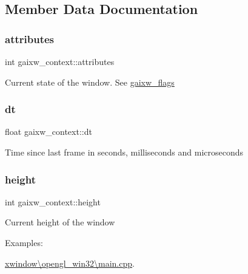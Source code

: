 \subsection{Member Data Documentation}
\mbox{\label{structgaixw__context_ab0f6565b924d7496d7445915f01294e2}} 
\subsubsection{\texorpdfstring{attributes}{attributes}}
{\footnotesize\ttfamily int gaixw\+\_\+context\+::attributes}

Current state of the window. See \hyperlink{gai__xwindow_8h_af7f3997c9f7d608f6f480d0a1ec341ec}{gaixw\+\_\+flags} \mbox{\label{structgaixw__context_a7b04c4d4c59ab6354686a79221673ad8}} 
\subsubsection{\texorpdfstring{dt}{dt}}
{\footnotesize\ttfamily float gaixw\+\_\+context\+::dt}

Time since last frame in seconds, milliseconds and microseconds \mbox{\label{structgaixw__context_a42531a46c276892a37d32595f819dd8e}} 
\subsubsection{\texorpdfstring{height}{height}}
{\footnotesize\ttfamily int gaixw\+\_\+context\+::height}

Current height of the window \begin{Desc}
\item[Examples\+: ]\par
\hyperlink{xwindow_0Copengl_win32_0Cmain_8cpp-example}{xwindow\textbackslash{}opengl\+\_\+win32\textbackslash{}main.\+cpp}.\end{Desc}
\mbox{\label{structgaixw__context_a4a9d2e14ebb24977fb5df84d361c851f}} 
